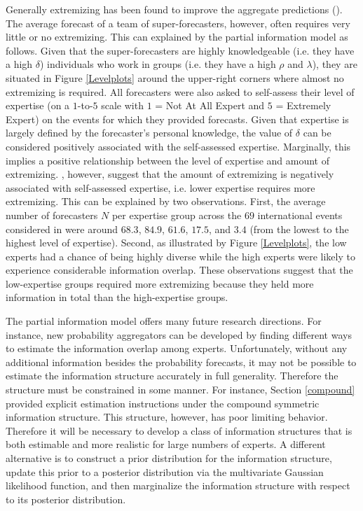 \documentclass[11pt]{article}
\theoremstyle{definition}
\theoremstyle{definition}
\begin{document}


Generally extremizing has been found to improve the aggregate predictions (\cite{mellers2014psychological}). The average forecast of a team of super-forecasters, however, often requires very little or no extremizing. This can explained by the partial information model as follows. Given that the  super-forecasters are highly knowledgeable (i.e. they have a high $\delta$) individuals who work in groups (i.e. they have a high $\rho$ and $\lambda$), they are situated in Figure \ref{Levelplots} around the upper-right corners where almost no extremizing is required. All forecasters were also asked to self-assess their level of expertise (on a $1$-to-$5$ scale with $1$ = Not At All Expert and $5$ = Extremely Expert) on the events for which they provided forecasts. Given that expertise is largely defined by the forecaster's personal knowledge, the value of $\delta$ can be considered positively associated with the self-assessed expertise. Marginally, this implies a positive relationship between the level of expertise and amount of extremizing. \cite{satopaa}, however, suggest that the amount of extremizing is negatively associated with self-assessed expertise, i.e. lower expertise requires more extremizing. This can be explained by two observations. First, the average number of forecasters $N$ per expertise group across the $69$ international events considered in \cite{satopaa} were around $68.3$, $84.9$, $61.6$, $17.5$, and $3.4$ (from the lowest to the highest level of expertise). Second, as illustrated by Figure \ref{Levelplots}, the low experts had a chance of being highly diverse while the high experts were likely to experience considerable information overlap. These observations suggest that the low-expertise groups required more extremizing because they held more information in total than the high-expertise groups.


The partial information model offers many future research directions. For instance, new probability aggregators can be developed by finding different ways  to estimate the information overlap among experts. Unfortunately, without any additional information besides the probability forecasts, it may not be possible to estimate the information structure accurately in full generality. Therefore the structure must be constrained in some manner. For instance, Section \ref{compound} provided explicit estimation instructions under the compound symmetric information structure. This structure, however, has poor limiting behavior. Therefore it will be necessary to develop a class of information structures that is  both estimable and more realistic for large numbers of experts.  A different alternative is to construct a prior distribution for the information structure, update this prior to a posterior distribution via the multivariate Gaussian likelihood function, and then marginalize the information structure with respect to its posterior distribution.  
\end{document}
